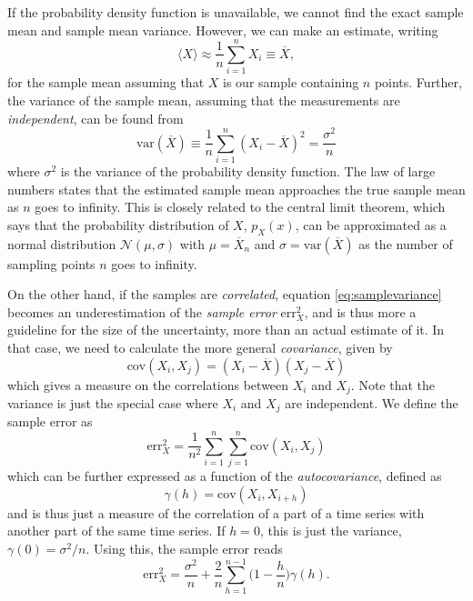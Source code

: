 If the probability density function is unavailable, we cannot find the exact sample mean and sample mean variance. However, we can make an estimate, writing
\begin{equation}
\langle X\rangle\approx \frac{1}{n}\sum_{i=1}^n X_i\equiv\overline{X},
\end{equation}
for the sample mean assuming that $X$ is our sample containing $n$ points. Further, the variance of the sample mean, assuming that the measurements are \textit{independent}, can be found from
\begin{equation}
\text{var}(\overline{X})\equiv\frac{1}{n}\sum_{i=1}^n(X_i-\overline{X})^2=\frac{\sigma^2}{n}
\label{eq:samplevariance}
\end{equation}
where $\sigma^2$ is the variance of the probability density function. The law of large numbers states that the estimated sample mean approaches the true sample mean as $n$ goes to infinity. This is closely related to the central limit theorem, which says that the probability distribution of $X$, $p_X(x)$, can be approximated as a normal distribution $\mathcal{N}(\mu,\sigma)$ with $\mu=\overline{X}_n$ and $\sigma=\text{var}(\overline{X})$ as the number of sampling points $n$ goes to infinity. 

On the other hand, if the samples are \textit{correlated}, equation \eqref{eq:samplevariance} becomes an underestimation of the \textit{sample error} $\text{err}_X^2$, and is thus more a guideline for the size of the uncertainty, more than an actual estimate of it. In that case, we need to calculate the more general \textit{covariance}, given by 
\begin{equation}
\text{cov}(X_i,X_j)=(X_i-\overline{X})(X_j-\overline{X})
\end{equation}
which gives a measure on the correlations between $X_i$ and $X_j$. Note that the variance is just the special case where $X_i$ and $X_j$ are independent. We define the sample error as
\begin{equation}
\text{err}_{X}^2=\frac{1}{n^2}\sum_{i=1}^n\sum_{j=1}^n\text{cov}(X_i,X_j)
\end{equation}
which can be further expressed as a function of the \textit{autocovariance}, defined as 
\begin{equation}
\gamma(h)=\text{cov}(X_i,X_{i+h})
\end{equation}
and is thus just a measure of the correlation of a part of a time series with another part of the same time series. If $h=0$, this is just the variance, $\gamma(0)=\sigma^2/n$. Using this, the sample error reads
\begin{equation}
\text{err}_X^2=\frac{\sigma^2}{n}+\frac{2}{n}\sum_{h=1}^{n-1}\Big(1-\frac{h}{n}\Big)\gamma(h).
\label{eq:samplevariance2}
\end{equation}

